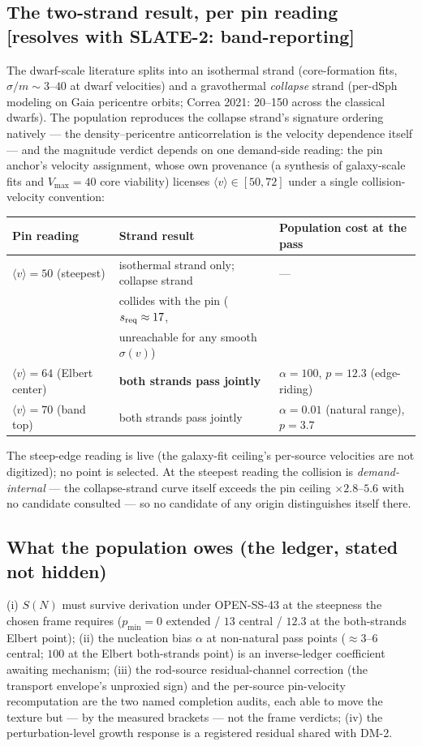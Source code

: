 \subsection{The two-strand result, per pin reading [resolves with SLATE-2: band-reporting]}
The dwarf-scale literature splits into an isothermal strand (core-formation
fits, $\sigma/m \sim 3$--$40$ at dwarf velocities) and a gravothermal
\emph{collapse} strand (per-dSph modeling on Gaia pericentre orbits; Correa
2021: 20--150 across the classical dwarfs). The population reproduces the
collapse strand's signature ordering natively --- the density--pericentre
anticorrelation is the velocity dependence itself --- and the magnitude verdict
depends on one demand-side reading: the pin anchor's velocity assignment, whose
own provenance (a synthesis of galaxy-scale fits and $V_{\max} = 40$ core
viability) licenses $\langle v \rangle \in [50, 72]$ under a single collision-velocity
convention:
\begin{center}
\begin{tabular}{lll}
\toprule
Pin reading & Strand result & Population cost at the pass \\
\midrule
$\langle v\rangle = 50$ (steepest) & isothermal strand only; collapse strand & --- \\
 & collides with the pin ($s_{\rm req} \approx 17$, & \\
 & unreachable for any smooth $\sigma(v)$) & \\
$\langle v\rangle = 64$ (Elbert center) & \textbf{both strands pass jointly} & $\alpha = 100$, $p = 12.3$ (edge-riding) \\
$\langle v\rangle = 70$ (band top) & both strands pass jointly & $\alpha = 0.01$ (natural range), $p = 3.7$ \\
\bottomrule
\end{tabular}
\end{center}
The steep-edge reading is live (the galaxy-fit ceiling's per-source velocities
are not digitized); no point is selected. At the steepest reading the collision
is \emph{demand-internal} --- the collapse-strand curve itself exceeds the pin
ceiling $\times 2.8$--$5.6$ with no candidate consulted --- so no candidate of
any origin distinguishes itself there.

\subsection{What the population owes (the ledger, stated not hidden)}
(i) $S(N)$ must survive derivation under OPEN-SS-43 at the steepness the chosen
frame requires ($p_{\min} = 0$ extended / $13$ central / $12.3$ at the
both-strands Elbert point); (ii) the nucleation bias $\alpha$ at non-natural
pass points ($\approx 3$--$6$ central; $100$ at the Elbert both-strands point)
is an inverse-ledger coefficient awaiting mechanism; (iii) the rod-source
residual-channel correction (the transport envelope's unproxied sign) and the
per-source pin-velocity recomputation are the two named completion audits, each
able to move the texture but --- by the measured brackets --- not the frame
verdicts; (iv) the perturbation-level growth response is a registered residual
shared with DM-2.

